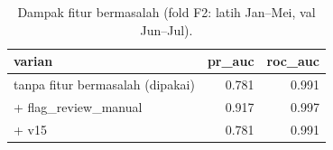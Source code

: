 \begin{table}[ht]
\centering\small
\begin{tabular}{lrr}
\toprule
varian & pr\_auc & roc\_auc \\
\midrule
tanpa fitur bermasalah (dipakai) & 0.781 & 0.991 \\
+ flag\_review\_manual & 0.917 & 0.997 \\
+ v15 & 0.781 & 0.991 \\
\bottomrule
\end{tabular}
\caption{Dampak fitur bermasalah (fold F2: latih Jan–Mei, val Jun–Jul).}
\label{tab:t2_audit_dampak}
\end{table}

